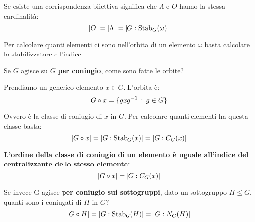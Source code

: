 Se esiste una corrispondenza biiettiva significa che $\Lambda$ e $O$ hanno la stessa cardinalità:
\begin{equation}
	\label{eq:ordine_orbita} \lvert O \rvert = \lvert \Lambda \rvert = \lvert G:\operatorname{Stab}_G(\omega) \rvert
\end{equation}

Per calcolare quanti elementi ci sono nell'orbita di un elemento $\omega$ basta calcolare lo stabilizzatore e l'indice.

Se $G$ agisce su $G$ \textbf{per coniugio}, come sono fatte le orbite?

Prendiamo un generico elemento $x \in G$.
L'orbita è:
\begin{equation*}
	G \circ x = \{gxg^{-1} \,:\, g \in G\}
\end{equation*}

Ovvero è la classe di coniugio di $x$ in $G$.
Per calcolare quanti elementi ha questa classe basta:
\begin{equation*}
	\lvert G \circ x \rvert = \lvert G:\operatorname{Stab}_G(x) \rvert = \lvert G:C_G(x) \rvert
\end{equation*}

\textbf{L'ordine della classe di coniugio di un elemento è uguale all'indice del centralizzante dello stesso elemento:}
\begin{equation}
	\label{eq:ordine_classe_coniugio}
	\lvert G \circ x \rvert = \lvert G:C_G(x) \rvert
\end{equation}

Se invece G agisce \textbf{per coniugio sui sottogruppi}, dato un sottogruppo $H \le G$, quanti sono i coniugati di $H$ in $G$?
\begin{equation}
	\label{eq:numero_coniugati_di_sottogruppo}
	\lvert G \circ H \rvert = \lvert G:\operatorname{Stab}_G(H) \rvert = \lvert G:N_G(H) \rvert
\end{equation}

